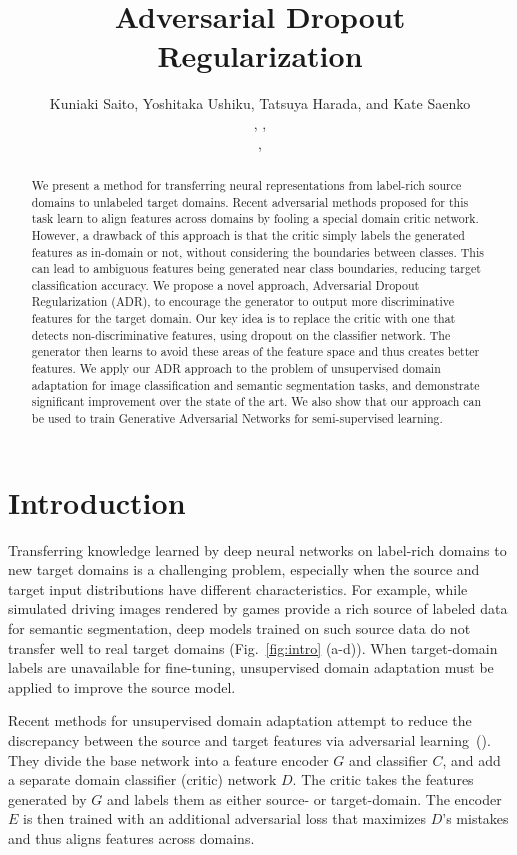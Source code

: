 \documentclass{article} \usepackage{iclr2018_conference,times}
\title{Adversarial Dropout Regularization}
\author{Kuniaki Saito\affmark[1], Yoshitaka Ushiku\affmark[1], Tatsuya Harada\affmark[1,2], and Kate Saenko\affmark[3]\\
  \affaddr{\affmark[1]The University of Tokyo}, \affaddr{\affmark[2]RIKEN}, \affaddr{\affmark[3]Boston University}\\
  \email{\{k-saito,ushiku,harada\}@mi.t.u-tokyo.ac.jp},   \email{saenko@bu.edu}\\
  }
\begin{document}
\maketitle

\begin{abstract}
We present a method for transferring neural representations from label-rich source domains to unlabeled target domains. Recent adversarial methods proposed for this task learn to align features across domains by fooling a special domain critic network. However, a drawback of this approach is that the critic simply labels the generated features as in-domain or not, without considering the boundaries between classes. This can lead to ambiguous features being generated near class boundaries, reducing target classification accuracy. We propose a novel approach, Adversarial Dropout Regularization (ADR), to encourage the generator to output more discriminative features for the target domain. Our key idea is to replace the critic with one that detects non-discriminative features, using dropout on the classifier network. The generator then learns to avoid these areas of the feature space and thus creates better features. We apply our ADR approach to the problem of unsupervised domain adaptation for image classification and semantic segmentation tasks, and demonstrate significant improvement over the state of the art. We also show that our approach can be used to train Generative Adversarial Networks for semi-supervised learning. 
\end{abstract}

\section{Introduction}
\vspace{-3mm}        


Transferring knowledge learned by deep neural networks on label-rich domains to new target domains is a challenging problem, especially when the source and target input distributions have different characteristics. For example, while simulated driving images rendered by games provide a rich source of labeled data for semantic segmentation, deep models trained on such source data do not transfer well to real target domains (Fig.~\ref{fig:intro} (a-d)). When target-domain labels are unavailable for fine-tuning, unsupervised domain adaptation must be applied to improve the source model. 

Recent methods for unsupervised domain adaptation attempt to reduce the discrepancy between the source and target features via adversarial learning~(\cite{tzeng2014deep,ganin2014unsupervised}). They divide the base network into a feature encoder $G$ and classifier $C$, and add a separate domain classifier (critic) network $D$. The critic takes the features generated by $G$ and labels them as either source- or target-domain. The encoder $E$ is then trained with an additional adversarial loss that maximizes $D$'s mistakes and thus aligns features across domains.
\end{document}
